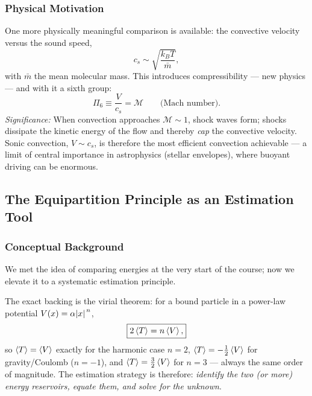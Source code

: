 \subsubsection*{Physical Motivation}
One more physically meaningful comparison is available: the convective
velocity versus the sound speed,
\begin{equation}
    c_s\sim\sqrt{\frac{k_BT}{\bar m}},
    \label{eq:lec09:sound-speed}
\end{equation}
with $\bar m$ the mean molecular mass. This introduces compressibility ---
new physics --- and with it a sixth group:
\begin{equation}
    \boxed{
    \Pi_6\equiv\frac{V}{c_s}=\mathcal{M}
    \qquad\text{(Mach number)}.
    }
    \label{eq:lec09:mach}
\end{equation}
\textit{Significance:} When convection approaches $\mathcal{M}\sim1$, shock
waves form; shocks dissipate the kinetic energy of the flow and thereby
\emph{cap} the convective velocity. Sonic convection,
$V\sim c_s$, is therefore the most efficient convection achievable --- a limit
of central importance in astrophysics (stellar envelopes), where buoyant
driving can be enormous.

\subsection{The Equipartition Principle as an Estimation Tool}
\label{sec:lec09:equipartition}

\subsubsection*{Conceptual Background}
We met the idea of comparing energies at the very start of the course; now we
elevate it to a systematic estimation principle.


The exact backing is the virial theorem: for a bound particle in a power-law
potential $V(x)=\alpha\abs{x}^{\,n}$,
\begin{equation}
    \boxed{
    2\expval{T}=n\expval{V},
    }
    \label{eq:lec09:virial}
\end{equation}
so $\expval{T}=\expval{V}$ exactly for the harmonic case $n=2$,
$\expval{T}=-\tfrac12\expval{V}$ for gravity/Coulomb ($n=-1$), and
$\expval{T}=\tfrac32\expval{V}$ for $n=3$ --- always the same order of
magnitude. The estimation strategy is therefore: \emph{identify the two (or
more) energy reservoirs, equate them, and solve for the unknown}.

